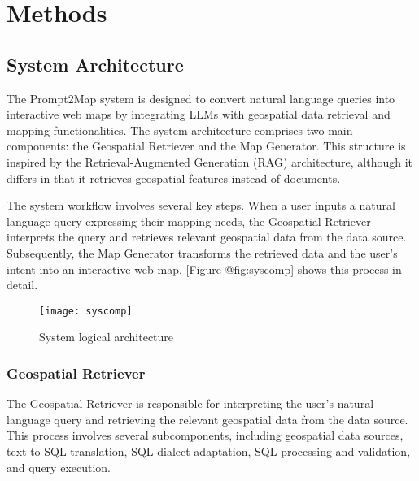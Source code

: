 
%

\chapter{Methods}
\label{cha:methods}

\section{System Architecture}

The Prompt2Map system is designed to convert natural language queries into interactive web maps by integrating LLMs with geospatial data retrieval and mapping functionalities. The system architecture comprises two main components: the Geospatial Retriever and the Map Generator. This structure is inspired by the Retrieval-Augmented Generation (RAG) architecture, although it differs in that it retrieves geospatial features instead of documents.

The system workflow involves several key steps. When a user inputs a natural language query expressing their mapping needs, the Geospatial Retriever interprets the query and retrieves relevant geospatial data from the data source. Subsequently, the Map Generator transforms the retrieved data and the user's intent into an interactive web map. [Figure @fig:syscomp] shows this process in detail.


\begin{figure}[htbp]
    \centering
    \texttt{[image: syscomp]}
    \caption{System logical architecture}
    \label{fig:system_logical_architecture}
  \end{figure}


\subsection{Geospatial Retriever}

The Geospatial Retriever is responsible for interpreting the user's natural language query and retrieving the relevant geospatial data from the data source. This process involves several subcomponents, including geospatial data sources, text-to-SQL translation, SQL dialect adaptation, SQL processing and validation, and query execution.

